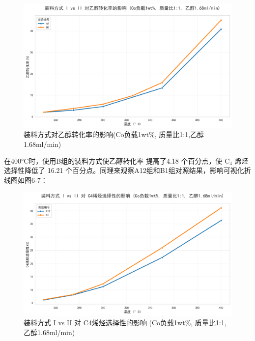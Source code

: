 \begin{figure}[h]%
	\centering%
	\includegraphics [scale=0.6]{图/2-1-2-2.png}
	\caption{装料方式对乙醇转化率的影响(Co负载1wt\%, 质量比1:1,乙醇1.68ml/min)} 
	\label{fig:1}
\end{figure}

在400°C时，使用B组的装料方式使乙醇转化率 提高了4.18 个百分点，使 \( \text{C}_4 \) 烯烃选择性降低了 16.21 个百分点。同理来观察A12组和B1组对照结果，影响可视化折线图如图6-7：

\begin{figure}[h]%
	\centering%
	\includegraphics [scale=0.6]{图/2-1-1-1.png}
	\caption{装料方式 I vs II 对 C4烯烃选择性的影响 (Co负载1wt\%, 质量比1:1, 乙醇1.68ml/min)} 
	\label{fig:1}
\end{figure}

